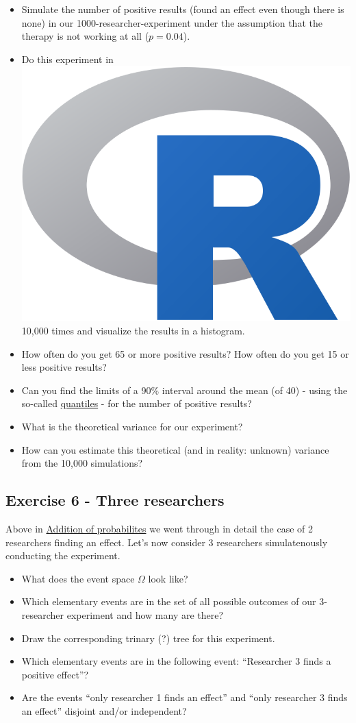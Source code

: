 \documentclass[
]{book}
\providecommand{\tightlist}{%
  \setlength{\itemsep}{0pt}\setlength{\parskip}{0pt}}
\begin{document}
\begin{itemize}
\tightlist
\item
  Simulate the number of positive results (found an effect even though there is none) in our 1000-researcher-experiment under the assumption that the therapy is not working at all (\(p=0.04\)).
\item
  Do this experiment in \includegraphics[height=1.8ex]{images/Rlogo.png} 10,000 times and visualize the results in a histogram.
\item
  How often do you get 65 or more positive results? How often do you get 15 or less positive results?
\item
  Can you find the limits of a 90\% interval around the mean (of 40) - using the so-called \href{https://en.wikipedia.org/wiki/Quantile}{quantiles} - for the number of positive results?
\item
  What is the theoretical variance for our experiment?
\item
  How can you estimate this theoretical (and in reality: unknown) variance from the 10,000 simulations?
\end{itemize}

\subsection{Exercise 6 - Three researchers}\label{exercise6}

Above in \hyperref[addition_of_probabilities]{Addition of probabilites} we went through in detail the case of 2 researchers finding an effect.
Let's now consider 3 researchers simulatenously conducting the experiment.

\begin{itemize}
\tightlist
\item
  What does the event space \(\Omega\) look like?
\item
  Which elementary events are in the set of all possible outcomes of our 3-researcher experiment and how many are there?
\item
  Draw the corresponding trinary (?) tree for this experiment.
\item
  Which elementary events are in the following event: ``Researcher 3 finds a positive effect''?
\item
  Are the events ``only researcher 1 finds an effect'' and ``only researcher 3 finds an effect'' disjoint and/or independent?
\end{itemize}
\end{document}

